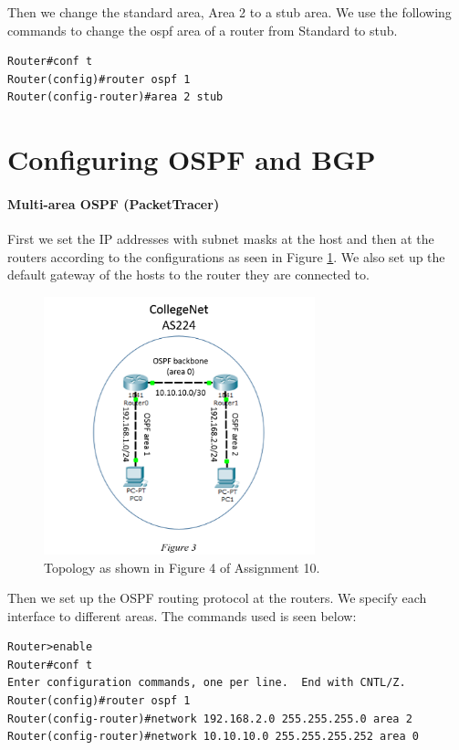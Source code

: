 \documentclass{article}
\begin{document}
Then we change the standard area, Area 2 to a stub area. We use the following commands to change the ospf area of a router from Standard to stub. 
\begin{verbatim}
Router#conf t
Router(config)#router ospf 1
Router(config-router)#area 2 stub
\end{verbatim}

\part{Configuring OSPF and BGP }

\subsection{Multi-area OSPF (PacketTracer)}

First we set the IP addresses with subnet masks at the host and then at the routers according to the configurations as seen in Figure \ref{fig:4topo}. We also set up the default gateway of the hosts to the router they are connected to.
\begin{figure}
    \centering
    \includegraphics[width=0.7\textwidth]{4topo}
    \caption{Topology as shown in Figure 4 of Assignment 10.}
    \label{fig:4topo}
\end{figure}

Then we set up the OSPF routing protocol at the routers. We specify each interface to different areas. The commands used is seen below:
\begin{verbatim}
Router>enable 
Router#conf t
Enter configuration commands, one per line.  End with CNTL/Z.
Router(config)#router ospf 1
Router(config-router)#network 192.168.2.0 255.255.255.0 area 2
Router(config-router)#network 10.10.10.0 255.255.255.252 area 0 
\end{verbatim}
\end{document}
